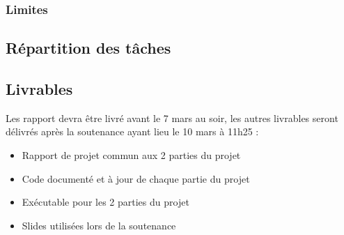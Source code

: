         \subsubsection{Limites}
    \subsection{Répartition des tâches}
    \subsection{Livrables}
        Les rapport devra être livré avant le 7 mars au soir, les autres livrables seront délivrés après la soutenance ayant lieu le 10 mars à 11h25 :
        
        \begin{itemize}
            \item Rapport de projet commun aux 2 parties du projet
            \item Code documenté et à jour de chaque partie du projet
            \item Exécutable pour les 2 parties du projet
            \item Slides utilisées lors de la soutenance
        \end{itemize}
